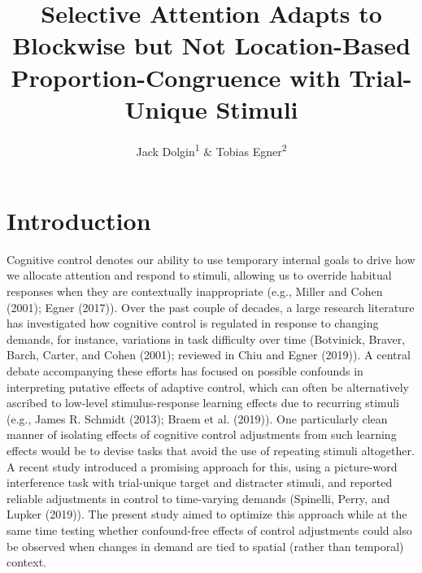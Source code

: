 \documentclass[
  ,man,floatsintext]{apa6}
\title{Selective Attention Adapts to Blockwise but Not Location-Based Proportion-Congruence with Trial-Unique Stimuli}
\author{Jack Dolgin\textsuperscript{1} \& Tobias Egner\textsuperscript{2}}
\date{}
\affiliation{\vspace{0.5cm}\textsuperscript{1} Washington University in St.~Louis\\\textsuperscript{2} Duke University}
\begin{document}
\maketitle

\hypertarget{introduction}{%
\section{Introduction}\label{introduction}}

Cognitive control denotes our ability to use temporary internal goals to drive how we allocate attention and respond to stimuli, allowing us to override habitual responses when they are contextually inappropriate (e.g., Miller and Cohen (2001); Egner (2017)). Over the past couple of decades, a large research literature has investigated how cognitive control is regulated in response to changing demands, for instance, variations in task difficulty over time (Botvinick, Braver, Barch, Carter, and Cohen (2001); reviewed in Chiu and Egner (2019)). A central debate accompanying these efforts has focused on possible confounds in interpreting putative effects of adaptive control, which can often be alternatively ascribed to low-level stimulus-response learning effects due to recurring stimuli (e.g., James R. Schmidt (2013); Braem et al. (2019)). One particularly clean manner of isolating effects of cognitive control adjustments from such learning effects would be to devise tasks that avoid the use of repeating stimuli altogether. A recent study introduced a promising approach for this, using a picture-word interference task with trial-unique target and distracter stimuli, and reported reliable adjustments in control to time-varying demands (Spinelli, Perry, and Lupker (2019)). The present study aimed to optimize this approach while at the same time testing whether confound-free effects of control adjustments could also be observed when changes in demand are tied to spatial (rather than temporal) context.
\end{document}
